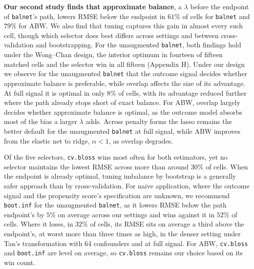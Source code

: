 \documentclass[
  12pt,
  a4paper,
]{article}
\begin{document}
\textbf{Our second study finds that approximate balance}, a \(\lambda\)
before the endpoint of \texttt{balnet}'s path, lowers RMSE below the
endpoint in \(61\%\) of cells for \texttt{balnet} and \(79\%\) for ABW.
We also find that tuning captures this gain in almost every such cell,
though which selector does best differs across settings and between
cross-validation and bootstrapping. For the unaugmented \texttt{balnet},
both findings hold under the Wong--Chan design, the interior optimum in
fourteen of fifteen matched cells and the selector win in all fifteen
(Appendix H). Under our design we observe for the unaugmented
\texttt{balnet} that the outcome signal decides whether approximate
balance is preferable, while overlap affects the size of its advantage.
At full signal it is optimal in only \(8\%\) of cells, with its
advantage reduced further where the path already stops short of exact
balance. For ABW, overlap largely decides whether approximate balance is
optimal, as the outcome model absorbs most of the bias a larger
\(\lambda\) adds. Across penalty forms the lasso remains the better
default for the unaugmented \texttt{balnet} at full signal, while ABW
improves from the elastic net to ridge, \(\alpha < 1\), as overlap
degrades.

Of the five selectors, \texttt{cv.bloss} wins most often for both
estimators, yet no selector maintains the lowest RMSE across more than
around \(30\%\) of cells. When the endpoint is already optimal, tuning
imbalance by bootstrap is a generally safer approach than by
cross-validation. For naive application, where the outcome signal and
the propensity score's specification are unknown, we recommend
\texttt{boot.inf} for the unaugmented \texttt{balnet}, as it lowers RMSE
below the path endpoint's by \(5\%\) on average across our settings and
wins against it in \(52\%\) of cells. Where it loses, in \(32\%\) of
cells, its RMSE sits on average a third above the endpoint's, at worst
more than three times as high, in the denser setting under Tan's
transformation with 64 confounders and at full signal. For ABW,
\texttt{cv.bloss} and \texttt{boot.inf} are level on average, so
\texttt{cv.bloss} remains our choice based on its win count.
\end{document}
